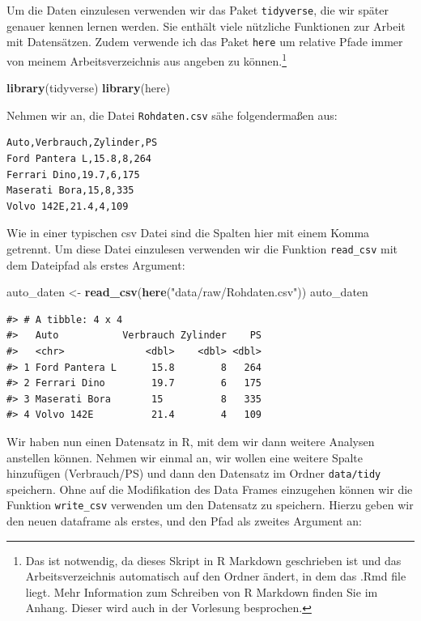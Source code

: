 \documentclass[]{book}
\newenvironment{Shaded}{\begin{snugshade}}{\end{snugshade}}
\newcommand{\KeywordTok}[1]{\textcolor[rgb]{0.13,0.29,0.53}{\textbf{#1}}}
\newcommand{\StringTok}[1]{\textcolor[rgb]{0.31,0.60,0.02}{#1}}
\newcommand{\NormalTok}[1]{#1}
\let\rmarkdownfootnote\footnote%
\def\footnote{\protect\rmarkdownfootnote}
\begin{document}
Um die Daten einzulesen verwenden wir das Paket \texttt{tidyverse}, die
wir später genauer kennen lernen werden. Sie enthält viele nützliche
Funktionen zur Arbeit mit Datensätzen. Zudem verwende ich das Paket
\texttt{here} um relative Pfade immer von meinem Arbeitsverzeichnis aus
angeben zu können.\footnote{Das ist notwendig, da dieses Skript in R
  Markdown geschrieben ist und das Arbeitsverzeichnis automatisch auf
  den Ordner ändert, in dem das .Rmd file liegt. Mehr Information zum
  Schreiben von R Markdown finden Sie im Anhang. Dieser wird auch in der
  Vorlesung besprochen.}

\begin{Shaded}
\begin{Highlighting}[]
\KeywordTok{library}\NormalTok{(tidyverse)}
\KeywordTok{library}\NormalTok{(here)}
\end{Highlighting}
\end{Shaded}

Nehmen wir an, die Datei \texttt{Rohdaten.csv} sähe folgendermaßen aus:

\begin{verbatim}
Auto,Verbrauch,Zylinder,PS
Ford Pantera L,15.8,8,264
Ferrari Dino,19.7,6,175
Maserati Bora,15,8,335
Volvo 142E,21.4,4,109
\end{verbatim}

Wie in einer typischen csv Datei sind die Spalten hier mit einem Komma
getrennt. Um diese Datei einzulesen verwenden wir die Funktion
\texttt{read\_csv} mit dem Dateipfad als erstes Argument:

\begin{Shaded}
\begin{Highlighting}[]
\NormalTok{auto_daten <-}\StringTok{ }\KeywordTok{read_csv}\NormalTok{(}\KeywordTok{here}\NormalTok{(}\StringTok{"data/raw/Rohdaten.csv"}\NormalTok{))}
\NormalTok{auto_daten}
\end{Highlighting}
\end{Shaded}

\begin{verbatim}
#> # A tibble: 4 x 4
#>   Auto           Verbrauch Zylinder    PS
#>   <chr>              <dbl>    <dbl> <dbl>
#> 1 Ford Pantera L      15.8        8   264
#> 2 Ferrari Dino        19.7        6   175
#> 3 Maserati Bora       15          8   335
#> 4 Volvo 142E          21.4        4   109
\end{verbatim}

Wir haben nun einen Datensatz in R, mit dem wir dann weitere Analysen
anstellen können. Nehmen wir einmal an, wir wollen eine weitere Spalte
hinzufügen (Verbrauch/PS) und dann den Datensatz im Ordner
\texttt{data/tidy} speichern. Ohne auf die Modifikation des Data Frames
einzugehen können wir die Funktion \texttt{write\_csv} verwenden um den
Datensatz zu speichern. Hierzu geben wir den neuen dataframe als erstes,
und den Pfad als zweites Argument an:
\end{document}
